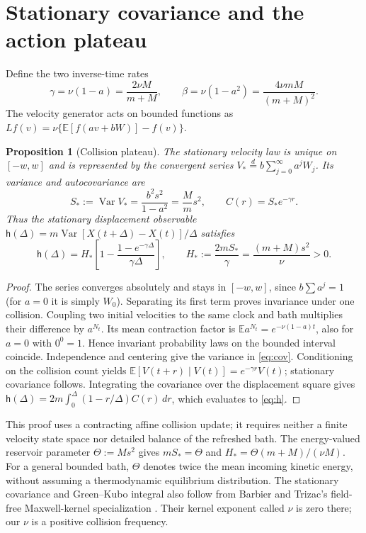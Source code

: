 \documentclass[11pt,a4paper]{article}
\newtheorem{proposition}{Proposition}
\newcommand{\E}{\mathbb E}
\newcommand{\Var}{\operatorname{Var}}
\begin{document}
\section{Stationary covariance and the action plateau}
Define the two inverse-time rates
\begin{equation}\label{eq:rates}
 \gamma=\nu(1-a)=\frac{2\nu M}{m+M},\qquad
 \beta=\nu(1-a^2)=\frac{4\nu mM}{(m+M)^2}.
\end{equation}
The velocity generator acts on bounded functions as
$Lf(v)=\nu\{\E[f(av+bW)]-f(v)\}$.

\begin{proposition}[Collision plateau]\label{prop:plateau}
The stationary velocity law is unique on $[-w,w]$ and is represented by the
convergent series $V_*\overset{d}=b\sum_{j=0}^\infty a^jW_j$.
Its variance and autocovariance are
\begin{equation}\label{eq:cov}
 S_*:=\Var V_*=\frac{b^2s^2}{1-a^2}=\frac{M}{m}s^2,
 \qquad C(r)=S_*e^{-\gamma r}.
\end{equation}
Thus the stationary displacement observable
$\mathsf h(\Delta)=m\Var[X(t+\Delta)-X(t)]/\Delta$ satisfies
\begin{equation}\label{eq:h}
 \mathsf h(\Delta)=H_*\left[1-\frac{1-e^{-\gamma\Delta}}
 {\gamma\Delta}\right],\qquad
 H_*:=\frac{2mS_*}{\gamma}=\frac{(m+M)s^2}{\nu}>0.
\end{equation}
\end{proposition}
\begin{proof}
The series converges absolutely and stays in $[-w,w]$, since
$b\sum a^j=1$ (for $a=0$ it is simply $W_0$).
Separating its first term proves invariance under one collision. Coupling two
initial velocities to the same clock and bath multiplies their difference by
$a^{N_t}$. Its mean contraction factor is
$\E a^{N_t}=e^{-\nu(1-a)t}$, also for $a=0$ with $0^0=1$.
Hence invariant probability laws on the bounded interval coincide.
Independence and centering give the variance in \eqref{eq:cov}.
Conditioning on the collision count yields
$\E[V(t+r)\mid V(t)]=e^{-\gamma r}V(t)$; stationary covariance follows.
Integrating the covariance over the displacement square gives
$\mathsf h(\Delta)=2m\int_0^\Delta(1-r/\Delta)C(r)\,dr$,
which evaluates to \eqref{eq:h}.
\end{proof}

This proof uses a contracting affine collision update; it requires neither a
finite velocity state space nor detailed balance of the refreshed bath.
The energy-valued reservoir parameter $\Theta:=Ms^2$ gives
$mS_*=\Theta$ and $H_*=\Theta(m+M)/(\nu M)$.
For a general bounded bath, $\Theta$ denotes twice the mean incoming kinetic
energy, without assuming a thermodynamic equilibrium distribution.
The stationary covariance and Green--Kubo integral also follow from
Barbier and Trizac's field-free Maxwell-kernel specialization
\cite[p.~19, (89)--(98)]{BarbierTrizac2012Field}. Their kernel exponent
called $\nu$ is zero there; our $\nu$ is a positive collision frequency.
\end{document}
